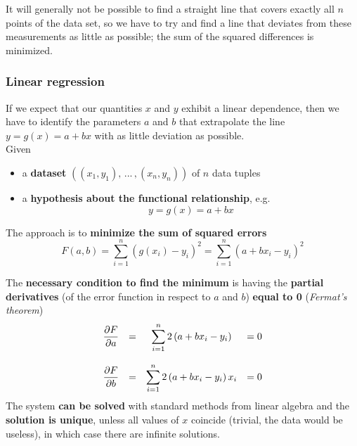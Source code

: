 It will generally not be possible to find a straight line that covers exactly all $n$ points of the data set, so we have to try and find a line that deviates from these measurements as little as possible; the sum of the squared differences is minimized.\\

\subsubsection{Linear regression}
If we expect that our quantities $x$ and $y$ exhibit a linear dependence, then we have to identify the parameters $a$ and $b$ that extrapolate the line $y = g(x) = a + bx$ with as little deviation as possible.\\

Given 
\begin{itemize}
	\item a \textbf{dataset} $\left((x_1, y_1), \, ... \, , (x_n, y_n) \right)$ of $n$ data tuples
	\item a \textbf{hypothesis about the functional relationship}, e.g. 
	$$y = g(x) = a + bx$$
\end{itemize}

The approach is to \textbf{minimize the sum of squared errors}
$$ F(a,b) = \sum_{i=1}^n \left(g(x_i) - y_i \right)^2 = \sum_{i=1}^n \left(a + bx_i - y_i\right)^2 $$

\newpage

The \textbf{necessary condition to find the minimum} is having the \textbf{partial derivatives} (of the error function in respect to $a$ and $b$) \textbf{equal to 0} (\textit{Fermat's theorem})
$$ \begin{array}{c c c c}
	\displaystyle \frac{\partial F}{\partial a} & = & \displaystyle \sum_{i=1}^n 2 \left(a + b x_i - y_i \right) & = 0 \\
	\hfill \\
	\displaystyle \frac{\partial F}{\partial b} & = & \displaystyle \sum_{i=1}^n 2 \left(a + b x_i - y_i \right)x_i & = 0
\end{array} $$
The system \textbf{can be solved} with standard methods from linear algebra and the \textbf{solution is unique}, unless all values of $x$ coincide (trivial, the data would be useless), in which case there are infinite solutions.\\

